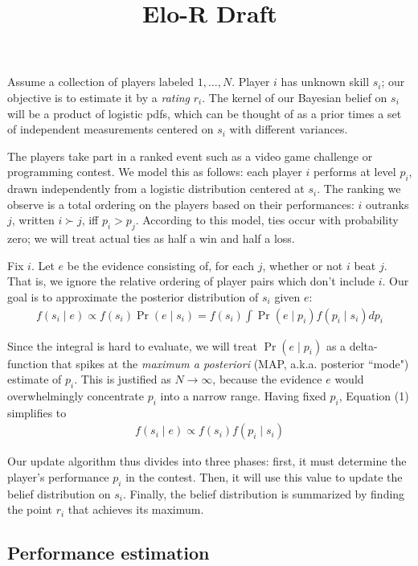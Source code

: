 \documentclass{article}
\title{Elo-R Draft}
\begin{document}
\maketitle

Assume a collection of players labeled $1,\ldots,N$. Player $i$ has unknown skill $s_i$; our objective is to estimate it by a \emph{rating} $r_i$. The kernel of our Bayesian belief on $s_i$ will be a product of logistic pdfs, which can be thought of as a prior times a set of independent measurements centered on $s_i$ with different variances.

The players take part in a ranked event such as a video game challenge or programming contest. We model this as follows: each player $i$ performs at level $p_i$, drawn independently from a logistic distribution centered at $s_i$. The ranking we observe is a total ordering on the players based on their performances: $i$ outranks $j$, written $i \succ j$, iff $p_i > p_j$. According to this model, ties occur with probability zero; we will treat actual ties as half a win and half a loss.

Fix $i$. Let $e$ be the evidence consisting of, for each $j$, whether or not $i$ beat $j$. That is, we ignore the relative ordering of player pairs which don't include $i$. Our goal is to approximate the posterior distribution of $s_i$ given $e$:
\begin{align}
f(s_i\mid e) \propto f(s_i)\Pr(e\mid s_i) = f(s_i)\int \Pr(e\mid p_i)f(p_i\mid s_i)dp_i
\end{align}

Since the integral is hard to evaluate, we will treat $\Pr(e\mid p_i)$ as a delta-function that spikes at the \emph{maximum a posteriori} (MAP, a.k.a. posterior ``mode") estimate of $p_i$. This is justified as $N \rightarrow \infty$, because the evidence $e$ would overwhelmingly concentrate $p_i$ into a narrow range. Having fixed $p_i$, Equation (1) simplifies to
\begin{align}
f(s_i\mid e) \propto f(s_i)f(p_i\mid s_i)
\end{align}

Our update algorithm thus divides into three phases: first, it must determine the player's performance $p_i$ in the contest. Then, it will use this value to update the belief distribution on $s_i$. Finally, the belief distribution is summarized by finding the point $r_i$ that achieves its maximum.

\subsection{Performance estimation}
\end{document}
